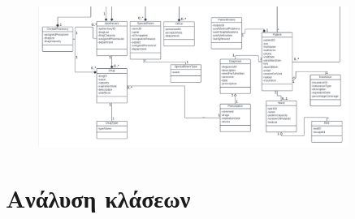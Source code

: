 \documentclass{article}
\begin{document}
\begin{figure}[!htb]
        \centering
        \includegraphics[width=0.9\textwidth]{domain2.png}
\end{figure}
        
\newpage
\section{Ανάλυση κλάσεων}
\end{document}
